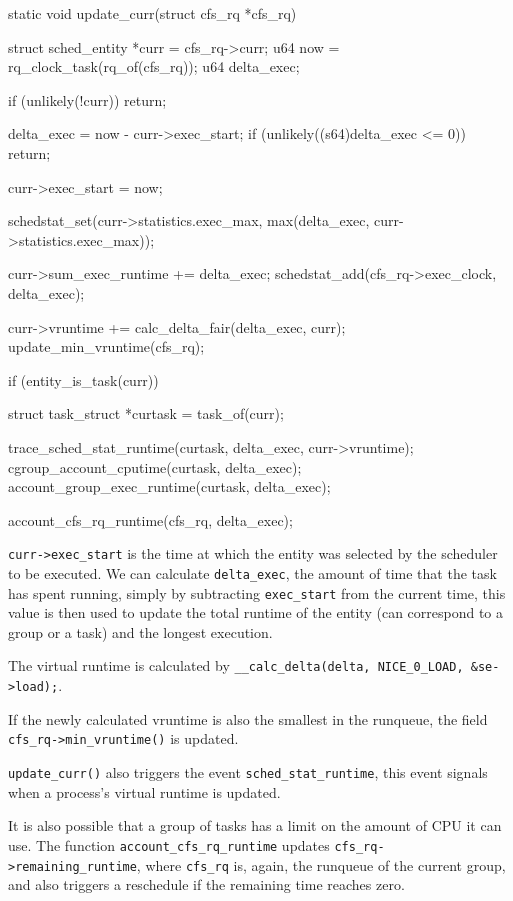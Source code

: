 \documentclass[10pt, oneside]{book}
\begin{document}
\begin{code}
static void update_curr(struct cfs_rq *cfs_rq)
{
  struct sched_entity *curr = cfs_rq->curr;
  u64 now = rq_clock_task(rq_of(cfs_rq));
  u64 delta_exec;

  if (unlikely(!curr))
    return;

  delta_exec = now - curr->exec_start;
  if (unlikely((s64)delta_exec <= 0))
    return;

  curr->exec_start = now;

  schedstat_set(curr->statistics.exec_max,
          max(delta_exec, curr->statistics.exec_max));

  curr->sum_exec_runtime += delta_exec;
  schedstat_add(cfs_rq->exec_clock, delta_exec);

  curr->vruntime += calc_delta_fair(delta_exec, curr);
  update_min_vruntime(cfs_rq);

  if (entity_is_task(curr)) {
    struct task_struct *curtask = task_of(curr);

    trace_sched_stat_runtime(curtask, delta_exec, curr->vruntime);
    cgroup_account_cputime(curtask, delta_exec);
    account_group_exec_runtime(curtask, delta_exec);
  }

  account_cfs_rq_runtime(cfs_rq, delta_exec);
}
\end{code}

\verb|curr->exec_start| is the time at which the entity was selected by the scheduler to be executed. %
We can calculate \verb|delta_exec|, the amount of time that the task has spent running, simply by subtracting \verb|exec_start| from the current time, this value is then used to update the total runtime of the entity (can correspond to a group or a task) and the longest execution.

The virtual runtime is calculated by \newline \verb|__calc_delta(delta, NICE_0_LOAD, &se->load);|. %

If the newly calculated vruntime is also the smallest in the runqueue, the field \verb|cfs_rq->min_vruntime()| is updated.

\verb|update_curr()| also triggers the event \verb|sched_stat_runtime|\label{trace:sched_stat_runtime}, this event signals when a process's virtual runtime is updated.

It is also possible that a group of tasks has a limit on the amount of CPU it can use. The function \verb|account_cfs_rq_runtime| updates \newline \verb|cfs_rq->remaining_runtime|, where \verb|cfs_rq| is, again, the runqueue of the current group, and also triggers a reschedule if the remaining time reaches zero.
\end{document}
